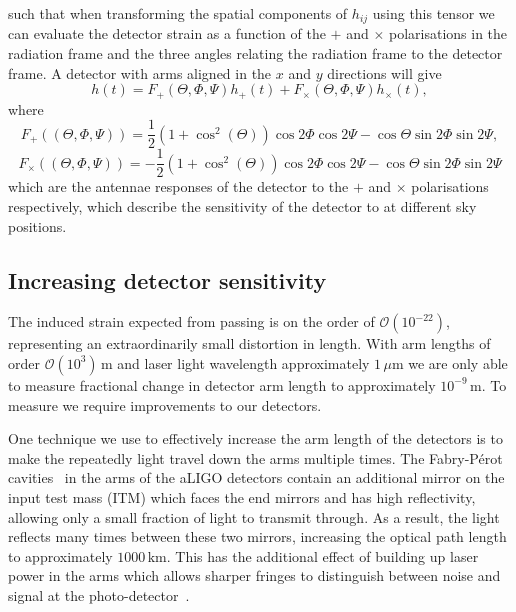 %
such that when transforming the spatial components of $h_{ij}$ using this tensor we can evaluate the detector strain as a function of the $+$ and $\times$ polarisations in the radiation frame and the three angles relating the radiation frame to the detector frame. A detector with arms aligned in the $x$ and $y$ directions will give
%
\begin{equation}
    h(t) = F_{+}(\Theta, \Phi, \Psi)h_{+}(t) + F_{\times}(\Theta, \Phi, \Psi)h_{\times}(t) ,
    \label{1:eq:h_t_linear_combination}
\end{equation}
%
where
%
\begin{equation}
    F_{+}((\Theta, \Phi, \Psi)) = \frac{1}{2}(1 + \cos^{2}(\Theta))\cos2\Phi\cos2\Psi - \cos\Theta\sin2\Phi\sin2\Psi,
\end{equation}
%
\begin{equation}
    F_{\times}((\Theta, \Phi, \Psi)) = -\frac{1}{2}(1 + \cos^{2}(\Theta))\cos2\Phi\cos2\Psi - \cos\Theta\sin2\Phi\sin2\Psi
\end{equation}
%
which are the antennae responses of the detector to the $+$ and $\times$ polarisations respectively, which describe the sensitivity of the detector to \gws at different sky positions. 


\subsection{\label{1:sec:increase-det-sens}Increasing detector sensitivity}

The induced strain expected from passing \gws is on the order of $\mathcal{O}(10^{-22})$, representing an extraordinarily small distortion in length. With arm lengths of order $\mathcal{O}(10^{3}) \, \text{m}$ and laser light wavelength approximately $1 \, \mu\text{m}$ we are only able to measure fractional change in detector arm length to approximately $10^{-9} \, \text{m}$. To measure \gws we require improvements to our detectors.

One technique we use to effectively increase the arm length of the detectors is to make the repeatedly light travel down the arms multiple times. The Fabry-Pérot cavities~\cite{aLIGO:2015} in the arms of the aLIGO detectors contain an additional mirror on the input test mass (ITM) which faces the end mirrors and has high reflectivity, allowing only a small fraction of light to transmit through. As a result, the light reflects many times between these two mirrors, increasing the optical path length to approximately $1000 \, \text{km}$. This has the additional effect of building up laser power in the arms which allows sharper fringes to distinguish between noise and signal at the photo-detector~\cite{Meers:1988}.

